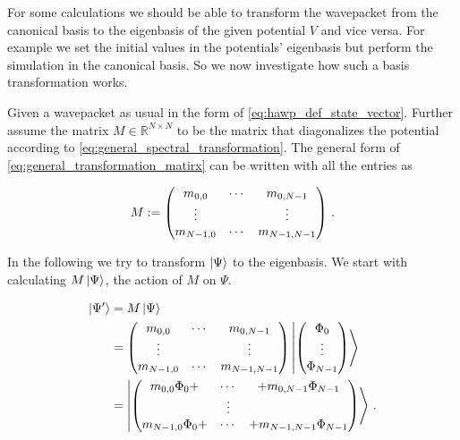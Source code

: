 For some calculations we should be able to transform the wavepacket from the canonical basis
to the eigenbasis of the given potential $V$ and vice versa. For example we set the initial
values in the potentials' eigenbasis but perform the simulation in the canonical basis. So we now
investigate how such a basis transformation works.

Given a wavepacket as usual in the form of \eqref{eq:hawp_def_state_vector}. Further assume the matrix
$M \in \mathbb{R}^{N \times N}$ to be the matrix that diagonalizes the potential
according to \eqref{eq:general_spectral_transformation}. The general form of \eqref{eq:general_transformation_matirx}
can be written with all the entries as

\begin{equation}
  M := \begin{pmatrix}
              m_{0,0} & \cdots & m_{0,N-1} \\
              \vdots  &        & \vdots  \\
              m_{N-1,0} & \cdots & m_{N-1,N-1}
            \end{pmatrix} \,.
\end{equation}

In the following we try to transform $\Ket{\Psi}$ to the eigenbasis. We start with
calculating $M \Ket{\Psi}$, the action of $M$ on $\Psi$.

\begin{equation}
\begin{split}
  \Ket{\Psi^{\prime}} & = M \Ket{\Psi} \\
               & = \begin{pmatrix}
                     m_{0,0} & \cdots & m_{0,N-1} \\
                     \vdots  &        & \vdots  \\
                     m_{N-1,0} & \cdots & m_{N-1,N-1}
                   \end{pmatrix}
                   \Ket{\begin{pmatrix} \Phi_0 \\ \vdots \\ \Phi_{N-1} \end{pmatrix}} \\
               & = \Ket{\begin{pmatrix} m_{0,0} \Phi_0 + & \cdots & + m_{0,N-1} \Phi_{N-1} \\ & \vdots & \\ m_{N-1,0} \Phi_0 + & \cdots & + m_{N-1,N-1} \Phi_{N-1} \end{pmatrix}} \,.
\end{split}
\end{equation}

